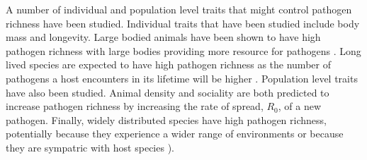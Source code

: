 

A number of individual and population level traits that might control pathogen richness have been studied.
Individual traits that have been studied include body mass and longevity.
Large bodied animals have been shown to have high pathogen richness with large bodies providing more resource for pathogens \cite{kamiya2014determines, arneberg2002host, poulin1995phylogeny}.
Long lived species are expected to have high pathogen richness as the number of pathogens a host encounters in its lifetime will be higher \cite{nunn2003comparative, ezenwa2006host}. 
Population level traits have also been studied.
Animal density \cite{kamiya2014determines, nunn2003comparative, arneberg2002host} and sociality \cite{bordes2007rodent, vitone2004body, altizer2003social, ezenwa2006host} are both predicted to increase pathogen richness by increasing the rate of spread, $R_0$, of a new pathogen.
Finally, widely distributed species have high pathogen richness, potentially because they experience a wider range of environments or because they are sympatric with host species \cite{kamiya2014determines, nunn2003comparative}).




